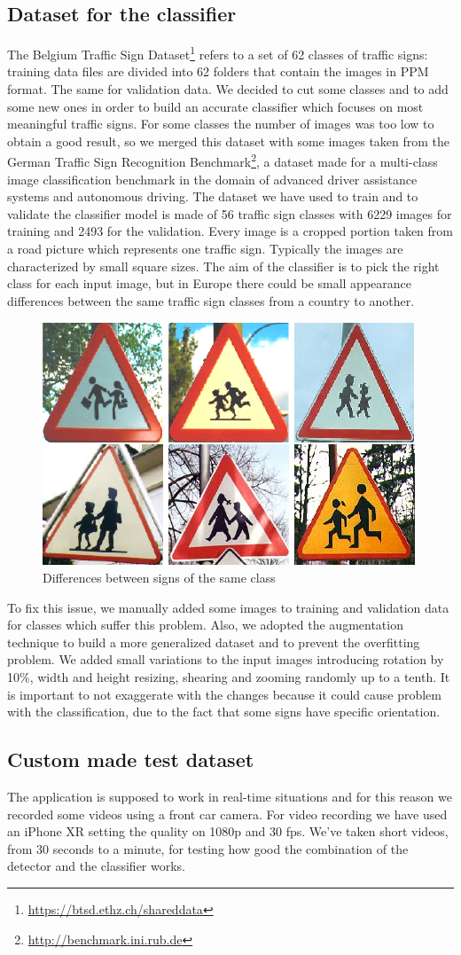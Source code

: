 \subsection{Dataset for the classifier}
The Belgium Traffic Sign Dataset\footnote{\url{https://btsd.ethz.ch/shareddata}} refers to a set of 62 classes of traffic signs: training data files are divided into 62 folders that contain the images in PPM format. The same for validation data. We decided to cut some classes and to add some new ones in order to build an accurate classifier which focuses on most meaningful traffic signs. For some classes the number of images was too low to obtain a good result, so we merged this dataset with some images taken from the German Traffic Sign Recognition Benchmark\footnote{\url{http://benchmark.ini.rub.de}}, a dataset made for a multi-class image classification benchmark in the domain of advanced driver assistance systems and autonomous driving. The dataset we have used to train and to validate the classifier model is made of 56 traffic sign classes with 6229 images for training and 2493 for the validation. Every image is a cropped portion taken from a road picture which represents one traffic sign. Typically the images are characterized by small square sizes. The aim of the classifier is to pick the right class for each input image, but in Europe there could be small appearance differences between the same traffic sign classes from a country to another. 
\begin{figure}{}
	\centering
	\includegraphics[width=0.6\linewidth]{Res/Immagini/differences.png}
	\caption{Differences between signs of the same class}\label{}
\end{figure}
To fix this issue, we manually added some images to training and validation data for classes which suffer this problem. Also, we adopted the augmentation technique to build a more generalized dataset and to prevent the overfitting problem. We added small variations to the input images introducing rotation by 10\%, width and height resizing, shearing and zooming randomly up to a tenth. It is important to not exaggerate with the changes because it could cause problem with the classification, due to the fact that some signs have specific orientation.

\subsection{Custom made test dataset}
The application is supposed to work in real-time situations and for this reason we recorded some videos using a front car camera. For video recording we have used an iPhone XR setting the quality on 1080p and 30 fps. We've taken short videos, from 30 seconds to a minute, for testing how good the combination of the detector and the classifier works.